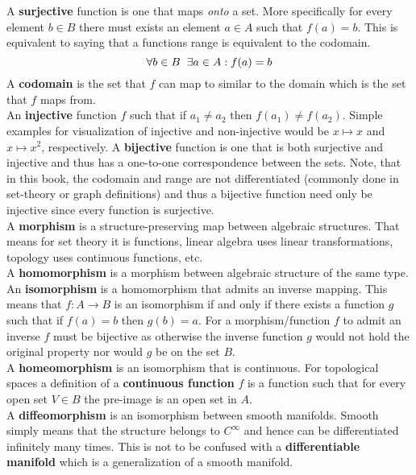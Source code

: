 \documentclass[a4paper]{article}
\begin{document}
\noindent A \textbf{surjective} function is one that maps \textit{onto} a set. More specifically for every element $b\in B$ there must exists an element $a\in A$ such that $f(a) = b$. This is equivalent to saying that a functions range is equivalent to the codomain.
$$
\forall b\in B\hspace{2mm}\exists a\in A : f(a) = b 
$$
A \textbf{codomain} is the set that $f$ can map to similar to the domain which is the set that $f$ maps from.\\

\noindent An \textbf{injective} function $f$ such that if $a_{1}\neq a_{2}$ then $f(a_{1})\neq f(a_{2})$. Simple examples for visualization of injective and non-injective would be $x\mapsto x$ and $x\mapsto x^{2}$, respectively. A \textbf{bijective} function is one that is both surjective and injective and thus has a one-to-one correspondence between the sets. Note, that in this book, the codomain and range are not differentiated (commonly done in set-theory or graph definitions) and thus a bijective function need only be injective since every function is surjective.\\

\noindent A \textbf{morphism} is a structure-preserving map between algebraic structures. That means for set theory it is functions, linear algebra uses linear transformations, topology uses continuous functions, etc.\\

\noindent A \textbf{homomorphism} is a morphism between algebraic structure of the same type.\\

\noindent An \textbf{isomorphism} is a homomorphism that admits an inverse mapping. This means that $f: A\rightarrow B$ is an isomorphism if and only if there exists a function $g$ such that if $f(a) = b$ then $g(b) = a$. For a morphism/function $f$ to admit an inverse $f$ must be bijective as otherwise the inverse function $g$ would not hold the original property nor would $g$ be on the set $B$.\\

\noindent A \textbf{homeomorphism} is an isomorphism that is continuous. For topological spaces a definition of a \textbf{continuous function} $f$ is a function such that for every open set $V\in B$ the pre-image is an open set in $A$.\\

\noindent A \textbf{diffeomorphism} is an isomorphism between smooth manifolds. Smooth simply means that the structure belongs to $C^{\infty}$ and hence can be differentiated infinitely many times. This is not to be confused with a \textbf{differentiable manifold} which is a generalization of a smooth manifold.\\
\end{document}

